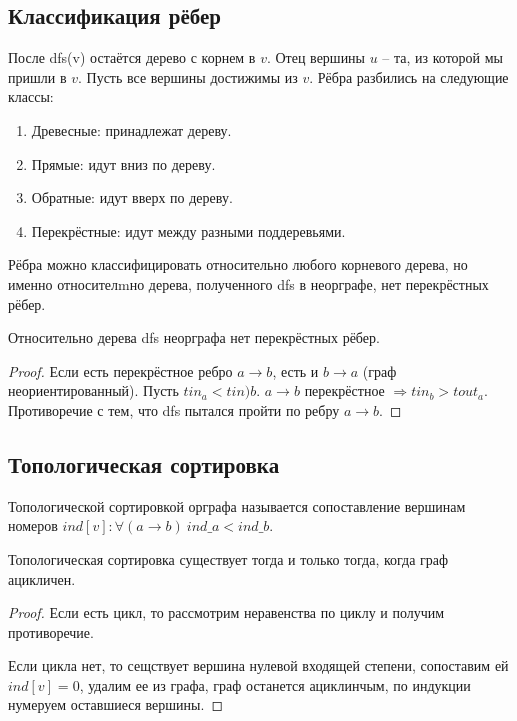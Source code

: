 \subsection{Классификация рёбер}
После dfs(v) остаётся дерево с корнем в $v$. Отец вершины $u$ – та, из которой мы пришли в $v$. Пусть все вершины достижимы из $v$. Рёбра разбились на следующие классы:
\begin{enumerate}
    \item Древесные: принадлежат дереву.
    \item Прямые: идут вниз по дереву.
    \item Обратные: идут вверх по дереву.
    \item Перекрёстные: идут между разными поддеревьями.
\end{enumerate}

Рёбра можно классифицировать относительно любого корневого дерева, но именно относителmно дерева, полученного dfs в неорграфе, нет перекрёстных рёбер.

\begin{lemma}
    Относительно дерева dfs неорграфа нет перекрёстных рёбер.
\end{lemma}

\begin{proof}
    Если есть перекрёстное ребро $a\rightarrow b$, есть и $b\rightarrow a$ (граф неориентированный). Пусть $tin_a<tin)b$. $a\rightarrow b$ перекрёстное $\Rightarrow tin_b>tout_a$. Противоречие с тем, что dfs пытался пройти по ребру $a\rightarrow b$.
\end{proof}

\subsection{Топологическая сортировка}
\begin{definition}
    Топологической сортировкой орграфа называется сопоставление вершинам номеров $ind[v]:\forall (a\rightarrow b)\ ind\_a<ind\_b$.

\end{definition}
\begin{lemma}
    Топологическая сортировка существует тогда и только тогда, когда граф ацикличен.
\end{lemma}

\begin{proof}
    Если есть цикл, то рассмотрим неравенства по циклу и получим противоречие.

    Если цикла нет, то сещствует вершина нулевой входящей степени, сопоставим ей $ind[v]=0$, удалим ее из графа, граф останется ациклинчым, по индукции нумеруем оставшиеся вершины.
\end{proof}

